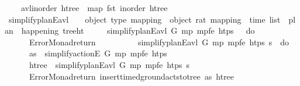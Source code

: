 \begin{isabellebody}
\ \ \ \ {\isachardoublequoteopen}avl{\isacharunderscore}{\kern0pt}inorder\ htree\ {\isacharequal}{\kern0pt}\ map\ fst\ {\isacharparenleft}{\kern0pt}inorder\ htree{\isacharparenright}{\kern0pt}{\isachardoublequoteclose}\isanewline
\isanewline
\ \ \isamarkupfalse%
\ simplify{\isacharunderscore}{\kern0pt}planE{\isacharunderscore}{\kern0pt}avl{\isacharprime}{\kern0pt}\ {\isacharcolon}{\kern0pt}{\isacharcolon}{\kern0pt}\ {\isachardoublequoteopen}{\isacharunderscore}{\kern0pt}\ {\isasymRightarrow}\ {\isacharparenleft}{\kern0pt}object{\isacharcomma}{\kern0pt}\ type{\isacharparenright}{\kern0pt}\ mapping\ {\isasymRightarrow}\ {\isacharparenleft}{\kern0pt}object{\isacharcomma}{\kern0pt}\ rat{\isacharparenright}{\kern0pt}\ mapping\ {\isasymRightarrow}\ time\ list\ {\isasymRightarrow}\ plan\ {\isasymRightarrow}\ {\isacharunderscore}{\kern0pt}{\isacharplus}{\kern0pt}happening\ tree{\isacharunderscore}{\kern0pt}ht{\isachardoublequoteclose}\ \isanewline
\ \ \ \ {\isachardoublequoteopen}simplify{\isacharunderscore}{\kern0pt}planE{\isacharunderscore}{\kern0pt}avl{\isacharprime}{\kern0pt}\ G\ mp\ mp{\isacharunderscore}{\kern0pt}fe\ htps\ {\isacharbrackleft}{\kern0pt}{\isacharbrackright}{\kern0pt}\ {\isacharequal}{\kern0pt}\ do\ {\isacharbraceleft}{\kern0pt}\ \isanewline
\ \ \ \ \ \ Error{\isacharunderscore}{\kern0pt}Monad{\isachardot}{\kern0pt}return\ {\isasymlangle}{\isasymrangle}\isanewline
\ \ \ \ {\isacharbraceright}{\kern0pt}{\isachardoublequoteclose}\ \isanewline
\ \ {\isacharbar}{\kern0pt}\ {\isachardoublequoteopen}simplify{\isacharunderscore}{\kern0pt}planE{\isacharunderscore}{\kern0pt}avl{\isacharprime}{\kern0pt}\ G\ mp\ mp{\isacharunderscore}{\kern0pt}fe\ htps\ {\isacharparenleft}{\kern0pt}{\isasympi}{\isacharhash}{\kern0pt}{\isasympi}s{\isacharparenright}{\kern0pt}\ {\isacharequal}{\kern0pt}\ do\ {\isacharbraceleft}{\kern0pt}\isanewline
\ \ \ \ \ \ as\ {\isasymleftarrow}\ simplify{\isacharunderscore}{\kern0pt}actionE\ G\ mp\ mp{\isacharunderscore}{\kern0pt}fe\ htps\ {\isasympi}{\isacharsemicolon}{\kern0pt}\isanewline
\ \ \ \ \ \ htree\ {\isasymleftarrow}\ simplify{\isacharunderscore}{\kern0pt}planE{\isacharunderscore}{\kern0pt}avl{\isacharprime}{\kern0pt}\ G\ mp\ mp{\isacharunderscore}{\kern0pt}fe\ htps\ {\isasympi}s{\isacharsemicolon}{\kern0pt}\isanewline
\ \ \ \ \ \ Error{\isacharunderscore}{\kern0pt}Monad{\isachardot}{\kern0pt}return\ {\isacharparenleft}{\kern0pt}insert{\isacharunderscore}{\kern0pt}timed{\isacharunderscore}{\kern0pt}ground{\isacharunderscore}{\kern0pt}acts{\isacharunderscore}{\kern0pt}to{\isacharunderscore}{\kern0pt}tree\ as\ htree{\isacharparenright}{\kern0pt}\isanewline

\end{isabellebody}
